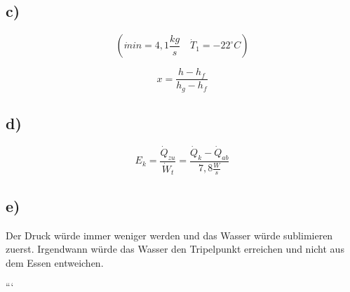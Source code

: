 \subsection*{c)}

\[
(\dot{m} in = 4,1 \frac{kg}{s} \quad \dot{T}_1 = -22^\circ C)
\]

\[
x = \frac{h - h_f}{h_g - h_f}
\]

\subsection*{d)}

\[
E_k = \frac{\dot{Q}_{zu}}{\dot{W}_t} = \frac{\dot{Q}_{k} - \dot{Q}_{ab}}{7,8 \frac{W}{s}}
\]

\subsection*{e)}

Der Druck würde immer weniger werden und das Wasser würde sublimieren zuerst. Irgendwann würde das Wasser den Tripelpunkt erreichen und nicht aus dem Essen entweichen.

```